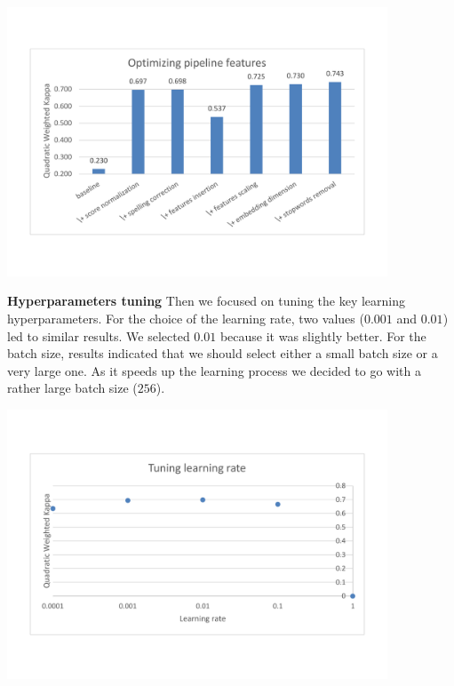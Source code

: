 \documentclass[a4paper,12pt,english]{article}
\begin{document}
\begin{center}
\vspace*{-1.5cm}
\includegraphics[width=0.85\textwidth]{fig/opt_pip_feat.pdf}
\vspace*{-1.5cm}
\end{center}

\textbf{Hyperparameters tuning} Then we focused on tuning the key learning hyperparameters. For the choice of the learning rate, two values ($0.001$ and $0.01$) led to similar results. We selected $0.01$ because it was slightly better. For the batch size, results indicated that we should select either a small batch size or a very large one. As it speeds up the learning process we decided to go with a rather large batch size ($256$).

\begin{center}
\vspace*{-1.5cm}
\includegraphics[width=0.85\textwidth]{fig/tune_lr.pdf}
\vspace*{-1.5cm}
\end{center}
\end{document}
